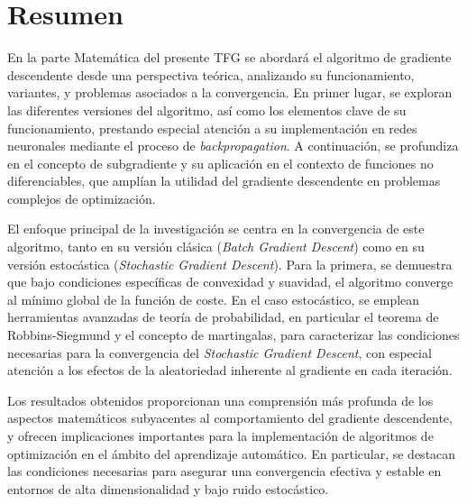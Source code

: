 \section*{Resumen}

En la parte Matemática del presente TFG se abordará el algoritmo de gradiente descendente desde una perspectiva teórica, analizando su funcionamiento, variantes, y problemas asociados a la convergencia. En primer lugar, se exploran las diferentes versiones del algoritmo, así como los elementos clave de su funcionamiento, prestando especial atención a su implementación en redes neuronales mediante el proceso de \textit{backpropagation}. A continuación, se profundiza en el concepto de subgradiente y su aplicación en el contexto de funciones no diferenciables, que amplían la utilidad del gradiente descendente en problemas complejos de optimización.

El enfoque principal de la investigación se centra en la convergencia de este algoritmo, tanto en su versión clásica (\textit{Batch Gradient Descent}) como en su versión estocástica (\textit{Stochastic Gradient Descent}). Para la primera, se demuestra que bajo condiciones específicas de convexidad y suavidad, el algoritmo converge al mínimo global de la función de coste. En el caso estocástico, se emplean herramientas avanzadas de teoría de probabilidad, en particular el teorema de Robbins-Siegmund y el concepto de martingalas, para caracterizar las condiciones necesarias para la convergencia del \textit{Stochastic Gradient Descent}, con especial atención a los efectos de la aleatoriedad inherente al gradiente en cada iteración.

Los resultados obtenidos proporcionan una comprensión más profunda de los aspectos matemáticos subyacentes al comportamiento del gradiente descendente, y ofrecen implicaciones importantes para la implementación de algoritmos de optimización en el ámbito del aprendizaje automático. En particular, se destacan las condiciones necesarias para asegurar una convergencia efectiva y estable en entornos de alta dimensionalidad y bajo ruido estocástico.

\newpage 

